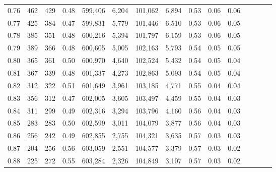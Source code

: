 \begin{tabular}{rrrcrrrrrrrrrrr}
0.76 &     462 &    429 &                                       0.48 &  599,406 &    6,204 &  101,062 &    6,894 &  0.53 &  0.06 &                         0.06 \\
0.77 &     425 &    384 &                                       0.47 &  599,831 &    5,779 &  101,446 &    6,510 &  0.53 &  0.06 &                         0.05 \\
0.78 &     385 &    351 &                                       0.48 &  600,216 &    5,394 &  101,797 &    6,159 &  0.53 &  0.06 &                         0.05 \\
0.79 &     389 &    366 &                                       0.48 &  600,605 &    5,005 &  102,163 &    5,793 &  0.54 &  0.05 &                         0.05 \\
0.80 &     365 &    361 &                                       0.50 &  600,970 &    4,640 &  102,524 &    5,432 &  0.54 &  0.05 &                         0.04 \\
0.81 &     367 &    339 &                                       0.48 &  601,337 &    4,273 &  102,863 &    5,093 &  0.54 &  0.05 &                         0.04 \\
0.82 &     312 &    322 &                                       0.51 &  601,649 &    3,961 &  103,185 &    4,771 &  0.55 &  0.04 &                         0.04 \\
0.83 &     356 &    312 &                                       0.47 &  602,005 &    3,605 &  103,497 &    4,459 &  0.55 &  0.04 &                         0.03 \\
0.84 &     311 &    299 &                                       0.49 &  602,316 &    3,294 &  103,796 &    4,160 &  0.56 &  0.04 &                         0.03 \\
0.85 &     283 &    283 &                                       0.50 &  602,599 &    3,011 &  104,079 &    3,877 &  0.56 &  0.04 &                         0.03 \\
0.86 &     256 &    242 &                                       0.49 &  602,855 &    2,755 &  104,321 &    3,635 &  0.57 &  0.03 &                         0.03 \\
0.87 &     204 &    256 &                                       0.56 &  603,059 &    2,551 &  104,577 &    3,379 &  0.57 &  0.03 &                         0.02 \\
0.88 &     225 &    272 &                                       0.55 &  603,284 &    2,326 &  104,849 &    3,107 &  0.57 &  0.03 &                         0.02 \\

\end{tabular}
